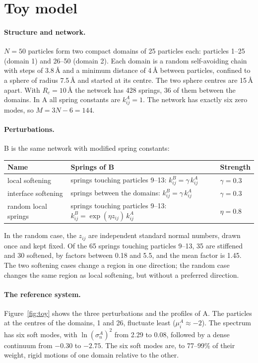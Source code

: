 \documentclass[11pt,a4paper]{article}
\begin{document}
\section{Toy model}

\paragraph{Structure and network.} $N = 50$ particles form two compact domains of 25 particles each: particles 1--25 (domain 1) and 26--50 (domain 2). Each domain is a random self-avoiding chain with steps of 3.8\,\AA{} and a minimum distance of 4\,\AA{} between particles, confined to a sphere of radius 7.5\,\AA{} and started at its centre. The two sphere centres are 15\,\AA{} apart. With $R_c = 10$\,\AA{} the network has 428 springs, 36 of them between the domains. In A all spring constants are $k^A_{ij} = 1$. The network has exactly six zero modes, so $M = 3N - 6 = 144$.

\paragraph{Perturbations.} B is the same network with modified spring constants:

\begin{center}
\begin{tabular}{lll}
\toprule
Name & Springs of B & Strength \\
\midrule
local softening & springs touching particles 9--13: $k^B_{ij} = \gamma\,k^A_{ij}$ & $\gamma = 0.3$ \\
interface softening & springs between the domains: $k^B_{ij} = \gamma\,k^A_{ij}$ & $\gamma = 0.3$ \\
random local springs & springs touching particles 9--13: $k^B_{ij} = \exp(\eta z_{ij})\,k^A_{ij}$ & $\eta = 0.8$ \\
\bottomrule
\end{tabular}
\end{center}

\noindent In the random case, the $z_{ij}$ are independent standard normal numbers, drawn once and kept fixed. Of the 65 springs touching particles 9--13, 35 are stiffened and 30 softened, by factors between 0.18 and 5.5, and the mean factor is 1.45. The two softening cases change a region in one direction; the random case changes the same region as local softening, but without a preferred direction.

\paragraph{The reference system.} Figure~\ref{fig:toy} shows the three perturbations and the profiles of A. The particles at the centres of the domains, 1 and 26, fluctuate least ($\mu^A_i \approx -2$). The spectrum has six soft modes, with $\ln(\sigma^A_n)^2$ from 2.29 to 0.08, followed by a dense continuum from $-0.30$ to $-2.75$. The six soft modes are, to 77--99\% of their weight, rigid motions of one domain relative to the other.
\end{document}
